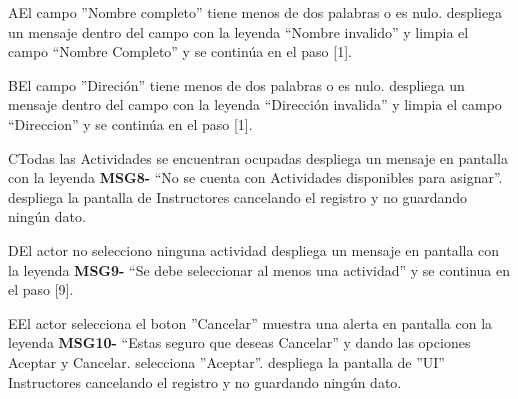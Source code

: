 \begin{UCtrayectoriaA}{A}{El campo ''Nombre completo'' tiene menos de dos palabras o es nulo.}
			\UCpaso despliega un mensaje dentro del campo con la leyenda “Nombre invalido” y limpia el campo “Nombre Completo” y se continúa en el paso [1].
\end{UCtrayectoriaA}
\begin{UCtrayectoriaA}{B}{El campo ''Direción'' tiene menos de dos palabras o es nulo.}
			\UCpaso despliega un mensaje dentro del campo con la leyenda “Dirección invalida” y limpia el campo “Direccion” y se continúa en el paso [1].
\end{UCtrayectoriaA}
\begin{UCtrayectoriaA}{C}{Todas las Actividades se encuentran ocupadas}
		   \UCpaso despliega un mensaje en pantalla con la leyenda {\bf MSG8-} “No se cuenta con Actividades disponibles para asignar”.
		   \UCpaso despliega la pantalla de Instructores cancelando el registro y no guardando ningún dato.
\end{UCtrayectoriaA}
\begin{UCtrayectoriaA}{D}{El actor no selecciono ninguna actividad}
		   \UCpaso despliega un mensaje en pantalla con la leyenda {\bf MSG9-} “Se debe seleccionar al menos una actividad” y se continua en el paso [9].	  
\end{UCtrayectoriaA}
\begin{UCtrayectoriaA}{E}{El actor selecciona el boton ''Cancelar''}
		   \UCpaso muestra una alerta en pantalla con la leyenda {\bf MSG10-} “Estas seguro que deseas Cancelar” y dando las opciones Aceptar y Cancelar.
		   \UCpaso[\UCactor] selecciona ''Aceptar''.
		   \UCpaso despliega la pantalla de ''UI'' Instructores cancelando el registro y no guardando ningún dato.
\end{UCtrayectoriaA}


